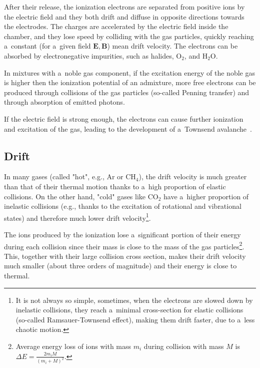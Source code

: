 		After their release, the ionization electrons are separated from positive ions by the electric field and they both drift and diffuse in opposite directions towards the electrodes. The charges are accelerated by the electric field inside the chamber, and they lose speed by colliding with the gas particles, quickly reaching a~constant (for a~given field $\mathbf{E}, \mathbf{B}$) mean drift velocity. The electrons can be absorbed by electronegative impurities, such as halides, O$_2$, and H$_2$O.
		
		In mixtures with a~noble gas component, if the excitation energy of the noble gas is higher then the ionization potential of an admixture, more free electrons can be produced through collisions of the gas particles (so\nobreakdash-called Penning transfer) and through absorption of emitted photons.
		
		If the electric field is strong enough, the electrons can cause further ionization and excitation of the gas, leading to the development of a~Townsend avalanche~\cite{Townsend1900}.
	
		\subsection{Drift}			
			In many gases (called "hot", e.g., Ar or CH$_4$), the drift velocity is much greater than that of their thermal motion thanks to a~high proportion of elastic collisions. On the other hand, "cold" gases like CO$_2$ have a~higher proportion of inelastic collisions (e.g., thanks to the excitation of rotational and vibrational states) and therefore much lower drift velocity\footnote{It is not always so simple, sometimes, when the electrons are slowed down by inelastic collisions, they reach a~minimal cross-section for elastic collisions (so-called Ramsauer-Townsend effect), making them drift faster, due to a~less chaotic motion.}.
			
			The ions produced by the ionization lose a~significant portion of their energy during each collision since their mass is close to the mass of the gas particles\footnote{Average energy loss of ions with mass $m_i$ during collision with mass $M$ is $\Delta E = \frac{2m_i M}{(m_i+M)^2}$.}. This, together with their large collision cross section, makes their drift velocity much smaller (about three orders of magnitude) and their energy is close to thermal.
			
